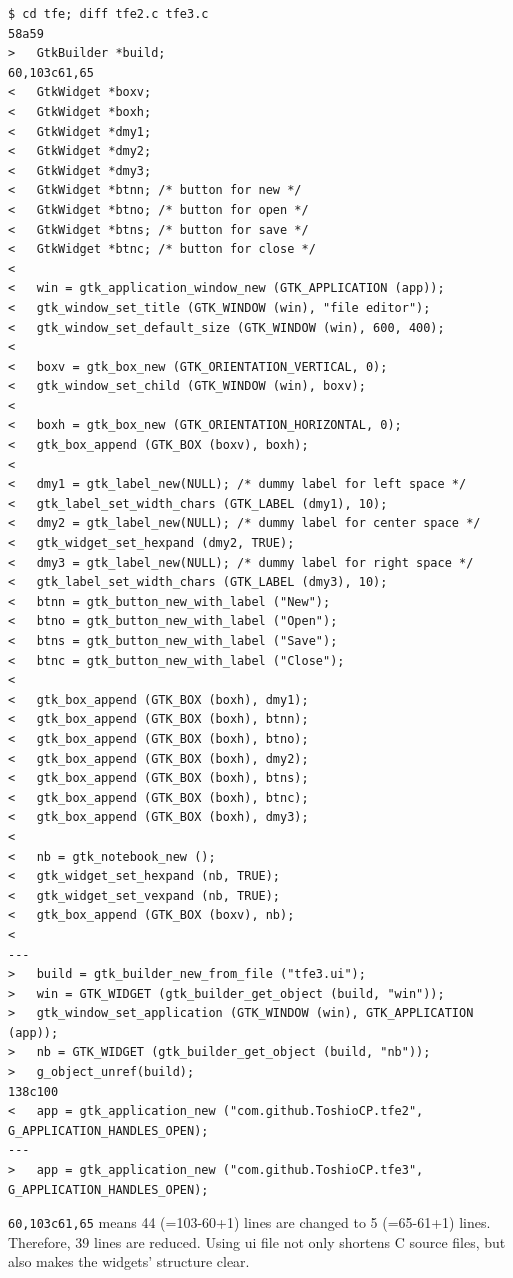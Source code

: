 \begin{lstlisting}
$ cd tfe; diff tfe2.c tfe3.c
58a59
>   GtkBuilder *build;
60,103c61,65
<   GtkWidget *boxv;
<   GtkWidget *boxh;
<   GtkWidget *dmy1;
<   GtkWidget *dmy2;
<   GtkWidget *dmy3;
<   GtkWidget *btnn; /* button for new */
<   GtkWidget *btno; /* button for open */
<   GtkWidget *btns; /* button for save */
<   GtkWidget *btnc; /* button for close */
< 
<   win = gtk_application_window_new (GTK_APPLICATION (app));
<   gtk_window_set_title (GTK_WINDOW (win), "file editor");
<   gtk_window_set_default_size (GTK_WINDOW (win), 600, 400);
< 
<   boxv = gtk_box_new (GTK_ORIENTATION_VERTICAL, 0);
<   gtk_window_set_child (GTK_WINDOW (win), boxv);
< 
<   boxh = gtk_box_new (GTK_ORIENTATION_HORIZONTAL, 0);
<   gtk_box_append (GTK_BOX (boxv), boxh);
< 
<   dmy1 = gtk_label_new(NULL); /* dummy label for left space */
<   gtk_label_set_width_chars (GTK_LABEL (dmy1), 10);
<   dmy2 = gtk_label_new(NULL); /* dummy label for center space */
<   gtk_widget_set_hexpand (dmy2, TRUE);
<   dmy3 = gtk_label_new(NULL); /* dummy label for right space */
<   gtk_label_set_width_chars (GTK_LABEL (dmy3), 10);
<   btnn = gtk_button_new_with_label ("New");
<   btno = gtk_button_new_with_label ("Open");
<   btns = gtk_button_new_with_label ("Save");
<   btnc = gtk_button_new_with_label ("Close");
< 
<   gtk_box_append (GTK_BOX (boxh), dmy1);
<   gtk_box_append (GTK_BOX (boxh), btnn);
<   gtk_box_append (GTK_BOX (boxh), btno);
<   gtk_box_append (GTK_BOX (boxh), dmy2);
<   gtk_box_append (GTK_BOX (boxh), btns);
<   gtk_box_append (GTK_BOX (boxh), btnc);
<   gtk_box_append (GTK_BOX (boxh), dmy3);
< 
<   nb = gtk_notebook_new ();
<   gtk_widget_set_hexpand (nb, TRUE);
<   gtk_widget_set_vexpand (nb, TRUE);
<   gtk_box_append (GTK_BOX (boxv), nb);
< 
---
>   build = gtk_builder_new_from_file ("tfe3.ui");
>   win = GTK_WIDGET (gtk_builder_get_object (build, "win"));
>   gtk_window_set_application (GTK_WINDOW (win), GTK_APPLICATION (app));
>   nb = GTK_WIDGET (gtk_builder_get_object (build, "nb"));
>   g_object_unref(build);
138c100
<   app = gtk_application_new ("com.github.ToshioCP.tfe2", G_APPLICATION_HANDLES_OPEN);
---
>   app = gtk_application_new ("com.github.ToshioCP.tfe3", G_APPLICATION_HANDLES_OPEN);
\end{lstlisting}

\passthrough{\lstinline!60,103c61,65!} means 44 (=103-60+1) lines are
changed to 5 (=65-61+1) lines. Therefore, 39 lines are reduced. Using ui
file not only shortens C source files, but also makes the widgets'
structure clear.

